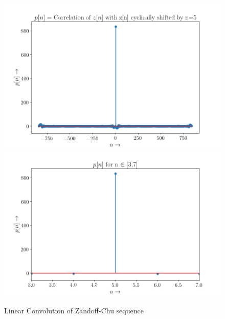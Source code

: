 \documentclass[11pt, a4paper]{article}
\begin{document}
\newpage
\begin{figure}[!tbh]
  \centering
  \includegraphics[scale=0.6]{./../Extras/a10-13.png}  
  \includegraphics[scale=0.6]{./../Extras/a10-14.png}  
  \caption{Linear Convolution of Zandoff-Chu sequence}
\end{figure}
\newpage
\end{document}
